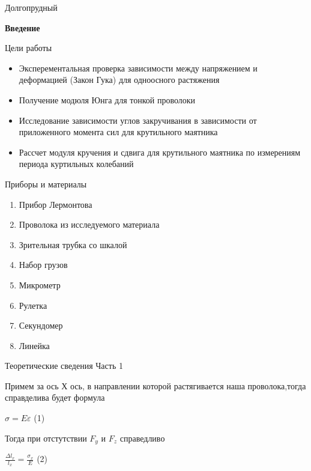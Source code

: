 \documentclass[12pt,a4paper]{article}
\begin{document}
\begin{center}
Долгопрудный 
\end{center}
\thispagestyle{empty}
\newpage
\begin{center}
\large{\bf Введение} 
\end{center}
\begin{center}
\large{Цели работы} \break
\end{center}
\begin{itemize}
\item Эксперементальная проверка зависимости между напряжением и деформацией (Закон Гука) для одноосного растяжения
\item Получение модюля Юнга для тонкой проволоки
\item Исследование зависимости углов закручивания в зависимости от приложенного момента сил для крутильного маятника
\item Рассчет модуля кручения и сдвига для крутильного маятника по измерениям периода куртильных колебаний
\end{itemize}
\hfill \break
\begin{center}
\large{Приборы и материалы}
\end{center}
\begin{enumerate}
\item Прибор Лермонтова
\item Проволока из исследуемого материала
\item Зрительная трубка со шкалой
\item Набор грузов
\item Микрометр
\item Рулетка
\item Секундомер
\item Линейка
\end{enumerate}
\newpage
\begin{center}
\large{Теоретические сведения} \break
{Часть 1}
\end{center}
\hfill \break
\begin{par}
{Примем за ось Х ось, в направлении которой растягивается наша проволока,тогда справделива будет формула}
\end{par}
\begin{center}
${\sigma=E\varepsilon}$ (1)
\end{center} 
{Тогда при отстутствии $F_{y}$ и $F_{z}$ справедливо}
\begin{center}
\large $\frac{\Delta{l_{x}}}{{l_{x}}}=\frac{\sigma_{x}}{E}$ (2)
\end{center}
\end{document}
